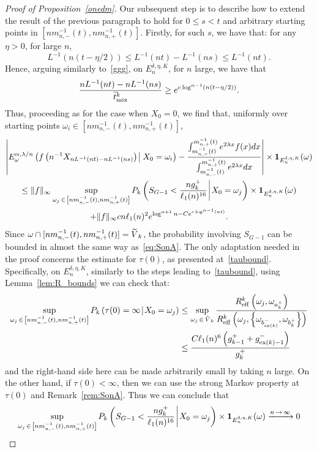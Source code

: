 \documentclass[10pt]{amsart}
\theoremstyle{definition}\newtheorem{defi}[theo]{Definition}\newtheorem{rema}[theo]{Remark}\newtheorem{exam}[theo]{Example}\newtheorem{exem}[theo]{Example}\newtheorem{nota}[theo]{Notation}
\newcommand{\bfun}{\mathbf{1}}
\newcommand{\mix}{\mathrm{mix}}
\newcommand{\eff}{\mathrm{eff}}
\newcommand{\Pk}{{P_k}}
\newcommand\ex{\operatorname{ex}}
\newcommand{\bt}[1]{b_{\ex(#1)}^-}
\newcommand{\gtt}[1]{g_{\ex(#1)-1}^-}
\newcommand{\B}{{16}}
\let\oldtilde\tilde
\renewcommand*{\tilde}[1]{\mathchoice{\widetilde{#1}}{\widetilde{#1}}{\oldtilde{#1}}{\oldtilde{#1}}}
\begin{document}
\begin{proof}[Proof of Proposition~\ref{onedm}]
Our subsequent step is to describe how to extend the result of the previous paragraph to hold for $0\leq s<t$ and arbitrary starting points in $[nm_{n,-}^{-1}(t),nm_{n,+}^{-1}(t)]$. Firstly, for such $s$, we have that: for any $\eta>0$, for large $n$,
\[
L^{-1}\left(n(t-\eta/2)\right)\leq L^{-1}(nt)-L^{-1}(ns)\leq L^{-1}(nt).
\]
Hence, arguing similarly to~\eqref{ggg}, on $E_n^{\delta,\eta,K}$, for $n$ large, we have that
\[
\frac{nL^{-1}(nt)-nL^{-1}(ns)}{\tilde{t}^k_{\mix}}\geq e^{c\log^{\alpha-1} (n(t-\eta/2))}.
\]
Thus, proceeding as for the case when $X_0=0$, we find that, uniformly over starting points $\omega_i\in [nm_{n,-}^{-1}(t),nm_{n,+}^{-1}(t)]$,
\begin{multline*}
{\left|{E}^{\alpha,\lambda/n}_\omega\left(f\left(n^{-1}{X}_{nL^{-1}(nt)-nL^{-1}(ns)}\right)\:\vline\:X_0=\omega_i\right)-\frac{\int_{m_{n,-}^{-1}(t)}^{m_{n,+}^{-1}(t)}e^{2\lambda x}f(x)dx}{\int_{m_{n,-}^{-1}(t)}^{m_{n,+}^{-1}(t)}e^{2\lambda x}dx}\right|\times\bfun_{E_n^{\delta,\eta,K}}(\omega)}\\
\leq \|f\|_\infty\sup_{\omega_j\,\in \,\left[nm_{n,-}^{-1}(t),nm_{n,+}^{-1}(t)\right]}{P}_k\left(S_{G-1}<\frac{ng_k^+}{\ell_1(n)^{\B}}\:\vline\:X_0=\omega_j\right)\times\bfun_{E_n^{\delta,\eta,K}}(\omega)\\
+\|f\|_\infty c n\ell_1(n)^2 e^{\log^{\alpha+1}n-Ce^{c\log^{\alpha-1} (nt)}}.
\end{multline*}
Since $\omega\cap[nm_{n,-}^{-1}(t),nm_{n,+}^{-1}(t)]=\tilde{V}_k$, the probability involving $S_{G-1}$ can be bounded in almost the same way as~\eqref{eq:SonA}. The only adaptation needed in the proof concerns the estimate for $\tau(0)$, as presented at~\eqref{taubound}. Specifically, on $E_n^{\delta,\eta,K}$, similarly to the steps leading to~\eqref{taubound}, using Lemma~\ref{lem:R_bounds} we can check that:
\begin{align*}
\sup_{\omega_j\,\in\,\left[nm_{n,-}^{-1}(t),nm_{n,+}^{-1}(t)\right]}\Pk\left(\tau(0)=\infty\:\vline\:X_0=\omega_j\right)&\leq
\sup_{\omega_j\,\in\,\tilde{V}_k}\frac{{R}^k_\eff\left(\omega_j,\omega_{a_k^+}\right)}{{R}^k_\eff\left(\omega_j,\left\{\omega_{\bt{k}},\omega_{{b}_k^+}\right\}\right)}\\
&\leq \frac{C\ell_1(n)^6\left(g_{k-1}^++\gtt{k}\right)}{g_k^+}
\end{align*}
and the right-hand side here can be made arbitrarily small by taking $n$ large. On the other hand, if $\tau(0)<\infty$, then we can use the strong Markov property at $\tau(0)$ and Remark~\ref{rem:SonA}. Thus we can conclude that
\[
\sup_{\omega_j\,\in\,\left[nm_{n,-}^{-1}(t),nm_{n,+}^{-1}(t)\right]}{P}_k\left(S_{G-1}<\frac{ng_k^+}{\ell_1(n)^{\B}}\:\vline\:X_0=\omega_j\right)\times\bfun_{E_n^{\delta,\eta,K}}(\omega)\xrightarrow{n\,\to\,\infty} 0
\]
\end{proof}
\end{document}
